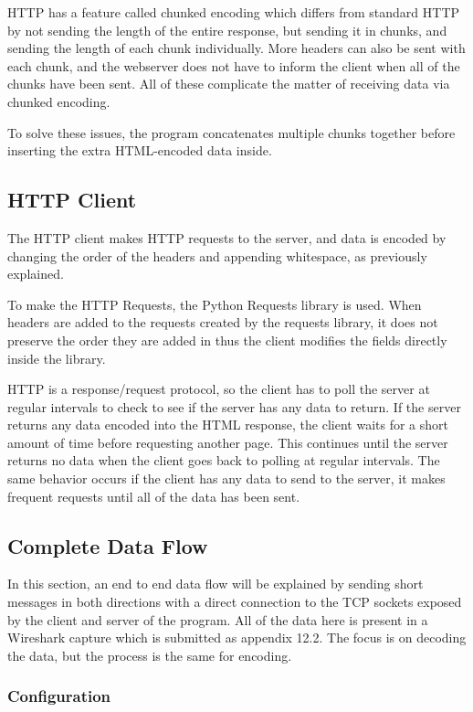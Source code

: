 HTTP has a feature called chunked encoding which differs from standard HTTP by not sending the length of the entire response, but sending it in chunks, and sending the length of each chunk individually.
More headers can also be sent with each chunk, and the webserver does not have to inform the client when all of the chunks have been sent. All of these complicate the matter of receiving data via chunked encoding.\par
To solve these issues, the program concatenates multiple chunks together before inserting the extra HTML-encoded data inside.

\subsection{HTTP Client}
The HTTP client makes HTTP requests to the server, and data is encoded by changing the order of the headers and appending whitespace, as previously explained.\par
To make the HTTP Requests, the Python Requests library is used. When headers are added to the requests created by the requests library, it does not preserve the order they are added in thus the client modifies the fields directly inside the library.\par
HTTP is a response/request protocol, so the client has to poll the server at regular intervals to check to see if the server has any data to return. If the server returns any data encoded into the HTML response, the client waits for a short amount of time before requesting another page. This continues until the server returns no data when the client goes back to polling at regular intervals. The same behavior occurs if the client has any data to send to the server, it makes frequent requests until all of the data has been sent.

\subsection{Complete Data Flow}
In this section, an end to end data flow will be explained by sending short messages in both directions with a direct connection to the TCP sockets exposed by the client and server of the program. All of the data here is present in a Wireshark capture which is submitted as appendix 12.2.
The focus is on decoding the data, but the process is the same for encoding.
\subsubsection{Configuration}

